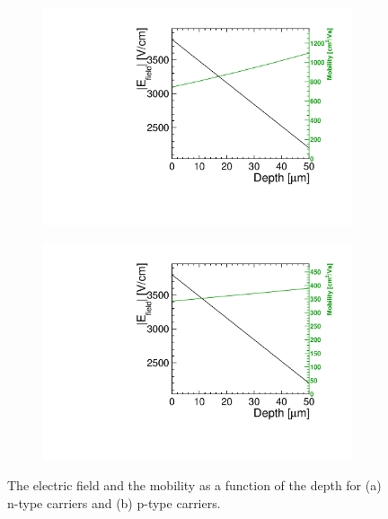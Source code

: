 \begin{figure}[htbp]
  \centering
  \begin{subfigure}[b]{0.45\textwidth}
    \includegraphics[width=\textwidth]{figures/ChargeSharing/Efield_mob_n_carrier.pdf}
    \caption{}
  \end{subfigure}\hfill
  \begin{subfigure}[b]{0.45\textwidth}
    \includegraphics[width=\textwidth]{figures/ChargeSharing/Efield_mob_p_carrier.pdf}
    \caption{}
  \end{subfigure}
  \caption{The electric field and the mobility as a function of the
    depth for (a) n-type carriers and (b) p-type
    carriers.}\label{fig:Efield_n_vs_p}
\end{figure}

